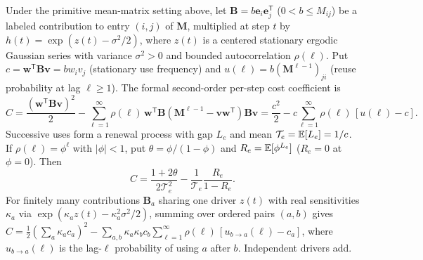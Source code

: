 \begin{proposition}\label{prop:ring-lineage}
Under the primitive mean-matrix setting above, let $\mathbf{B} = b\mathbf{e}_i\mathbf{e}_j^{\mathsf{T}}$ ($0 < b \le M_{ij}$) be a labeled contribution to entry $(i,j)$ of $\mathbf{M}$, multiplied at step $t$ by $h(t) = \exp(z(t) - \sigma^2/2)$, where $z(t)$ is a centered stationary ergodic Gaussian series with variance $\sigma^2 > 0$ and bounded autocorrelation $\rho(\ell)$. Put $c = \mathbf{w}^{\mathsf{T}}\mathbf{B}\mathbf{v} = b w_i v_j$ (stationary use frequency) and $u(\ell) = b(\mathbf{M}^{\ell-1})_{ji}$ (reuse probability at lag $\ell \ge 1$). The formal second-order per-step cost coefficient is
\begin{equation}
C = \frac{(\mathbf{w}^{\mathsf{T}}\mathbf{B}\mathbf{v})^2}{2} - \sum_{\ell=1}^{\infty} \rho(\ell)\,\mathbf{w}^{\mathsf{T}}\mathbf{B}(\mathbf{M}^{\ell-1} - \mathbf{v}\mathbf{w}^{\mathsf{T}})\mathbf{B}\mathbf{v} = \frac{c^2}{2} - c \sum_{\ell=1}^{\infty} \rho(\ell)\,[u(\ell) - c].
\label{eq:ring-lineage}
\end{equation}
Successive uses form a renewal process with gap $L_e$ and mean $\mathcal{T}_e = \mathbb{E}[L_e] = 1/c$. If $\rho(\ell) = \phi^\ell$ with $|\phi| < 1$, put $\theta = \phi/(1 - \phi)$ and $R_e = \mathbb{E}[\phi^{L_e}]$ ($R_e = 0$ at $\phi = 0$). Then
\begin{equation}
C = \frac{1 + 2\theta}{2\mathcal{T}_e^2} - \frac{1}{\mathcal{T}_e}\frac{R_e}{1 - R_e}.
\label{eq:ring-renewal}
\end{equation}
For finitely many contributions $\mathbf{B}_a$ sharing one driver $z(t)$ with real sensitivities $\kappa_a$ via $\exp(\kappa_a z(t) - \kappa_a^2\sigma^2/2)$, summing over ordered pairs $(a,b)$ gives $C = \frac{1}{2}(\sum_a \kappa_a c_a)^2 - \sum_{a,b} \kappa_a \kappa_b c_b \sum_{\ell=1}^{\infty} \rho(\ell)\,[u_{b \to a}(\ell) - c_a]$, where $u_{b \to a}(\ell)$ is the lag-$\ell$ probability of using $a$ after $b$. Independent drivers add.
\end{proposition}

